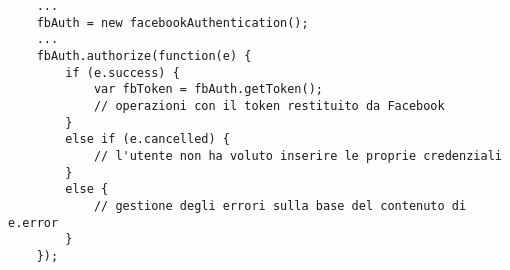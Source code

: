 \begin{lstlisting}
	...
	fbAuth = new facebookAuthentication();
	...
	fbAuth.authorize(function(e) {
		if (e.success) {
			var fbToken = fbAuth.getToken();
			// operazioni con il token restituito da Facebook
		}
		else if (e.cancelled) {
			// l'utente non ha voluto inserire le proprie credenziali
		}
		else {
			// gestione degli errori sulla base del contenuto di e.error
		}
	});
\end{lstlisting}
